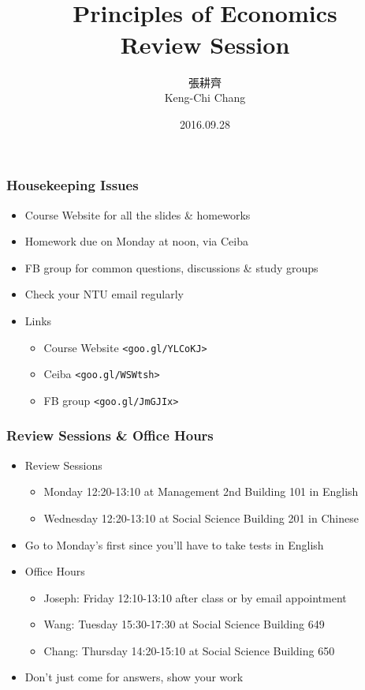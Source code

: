 \documentclass[12pt, xcolor=dvipsnames]{beamer}
\title{\bf{\Huge {}\\[-2mm] Principles of Economics \\[2mm] Review Session}}
\author{{\Large 張耕齊\\[2mm] Keng-Chi Chang}}
\institute{{}\\[-7mm]\footnotesize\tt{<r03323070@ntu.edu.tw>}\\[2mm]}
\date{\large 2016.09.28}
\begin{document}
\fontsize{12}{14pt}\selectfont


\begin{frame}
\titlepage
\end{frame}


\begin{frame}
\frametitle{\bf Housekeeping Issues}
\begin{itemize}
\item Course Website for all the slides \& homeworks
\item Homework due on Monday at noon, via Ceiba
\item FB group for common questions, discussions \&  study groups 
\item Check your NTU email regularly
\item Links
\begin{itemize}
\item Course Website {\footnotesize \tt <goo.gl/YLCoKJ>}
\item Ceiba {\footnotesize \tt <goo.gl/WSWtsh>}
\item FB group {\footnotesize \tt <goo.gl/JmGJIx>} 
\end{itemize}
\end{itemize}
\end{frame}


\begin{frame}
\frametitle{\bf Review Sessions \& Office Hours}
\begin{itemize}
\item Review Sessions
\begin{itemize}
\item Monday 12:20-13:10 at Management 2nd Building 101 in English
\item Wednesday 12:20-13:10 at Social Science Building 201 in Chinese
\end{itemize}
\item Go to Monday's first since you'll have to take tests in English 
\item Office Hours
\begin{itemize}
\item Joseph: Friday 12:10-13:10 after class or by email appointment
\item Wang: Tuesday 15:30-17:30 at Social Science Building 649
\item Chang: Thursday 14:20-15:10 at Social Science Building 650
\end{itemize}
\item Don't just come for answers, show your work
\end{itemize}
\end{frame}
\end{document}
